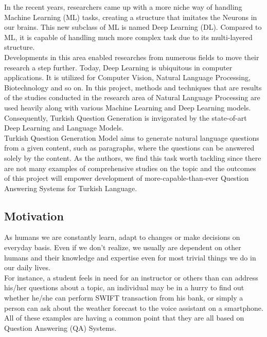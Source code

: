 \documentclass{mefsdp}
\begin{document}
	In the recent years, researchers came up with a more niche way of handling Machine Learning (ML) tasks, creating a structure that imitates the Neurons in our brains. This new subclass of ML is named Deep Learning (DL). Compared to ML, it is capable of handling much more complex task due to its multi-layered structure.\\
	
	Developments in this area enabled researches from numerous fields to move their research a step further. Today, Deep Learning is ubiquitous in computer applications. It is utilized for Computer Vision, Natural Language Processing, Biotechnology and so on. In this project, methods and techniques that are results of the studies conducted in the research area of Natural Language Processing are used heavily along with various Machine Learning and Deep Learning models. Consequently, Turkish Question Generation is invigorated by the state-of-art Deep Learning and Language Models.\\
	
	Turkish Question Generation Model aims to generate natural language questions from a given content, such as paragraphs, where the questions can be answered solely by the content.   As the authors, we find this task worth tackling since there are not many examples of comprehensive studies on the topic and the outcomes of this project will empower development of more-capable-than-ever Question Answering Systems for Turkish Language. 
	\newpage
	
	\subsection{Motivation}
	
	As humans we are constantly learn, adapt to changes or make decisions on everyday basis. Even if we don’t realize, we usually are dependent on other humans and their knowledge and expertise even for most trivial things we do in our daily lives.\\
	
	For instance, a student feels in need for an instructor or others than can address his/her questions about a topic, an individual may be in a hurry to find out whether he/she can perform SWIFT transaction from his bank, or simply a person can ask about the weather forecast to the voice assistant on a smartphone. All of these examples are having a common point that they are all based on Question Answering (QA) Systems.\\
	
\end{document}

